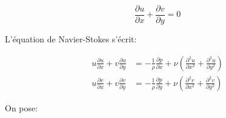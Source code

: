\documentclass[french]{article}
\begin{document}
\begin{equation}
\label{Eq:1}
\frac{\partial u}{\partial x} + \frac{\partial v}{\partial y} = 0
\end{equation}


L'équation de Navier-Stokes s'écrit:

\begin{align}%
	u\frac{\partial u}{\partial x} + 
	v\frac{\partial u}{\partial y} 
	&= - \frac{1}{\rho}
	\frac{\partial p}{\partial  x} +
	\nu\left (
	\frac{\partial^{2} u}{\partial  x^{2}} + 
	\frac{\partial^{2} u}{\partial  y^{2}}
	\right ) \\
	u\frac{\partial v}{\partial x} + 
	v\frac{\partial v}{\partial y} 
	&= - \frac{1}{\rho}
	\frac{\partial p}{\partial  y} +
	\nu\left (
	\frac{\partial^{2} v}{\partial  x^{2}} + 
	\frac{\partial^{2} v}{\partial  y^{2}}
	\right ) 
\end{align}

On pose:
\end{document}
